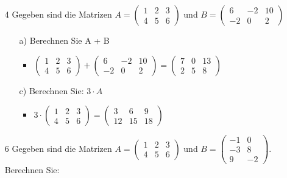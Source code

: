 \documentclass{article}
\begin{document}
\begin{itemize}
		\item[4]{Gegeben sind die Matrizen $A=\begin{pmatrix} 1 & 2 & 3 \\ 4 & 5 & 6 \end{pmatrix}$ und $B=\begin{pmatrix} 6 & -2 & 10 \\ -2 & 0 & 2 \end{pmatrix}$}
		\begin{itemize}
			\item[a)]{Berechnen Sie A + B}
			\begin{itemize}
				\item{$\begin{pmatrix} 1 & 2 & 3 \\ 4 & 5 & 6 \end{pmatrix}+\begin{pmatrix} 6 & -2 & 10 \\ -2 & 0 & 2 \end{pmatrix}=\begin{pmatrix} 7 & 0 & 13 \\ 2 & 5 & 8 \end{pmatrix}$}
			\end{itemize}
			\item[c)]{Berechnen Sie: $3 \cdot A$}
			\begin{itemize}
				\item{$3\cdot\begin{pmatrix} 1 & 2 & 3 \\ 4 & 5 & 6 \end{pmatrix}=\begin{pmatrix} 3 & 6 & 9 \\ 12 & 15 & 18 \end{pmatrix}$}
			\end{itemize}
		\end{itemize}
		\item[6]{Gegeben sind die Matrizen $A=\begin{pmatrix} 1 & 2 & 3 \\ 4 & 5 & 6 \end{pmatrix}$ und $B=\begin{pmatrix} -1 & 0 \\ -3 & 8 \\ 9 & -2 \end{pmatrix}$. Berechnen Sie:}
		\begin{itemize}

\end{itemize}
\end{itemize}
\end{document}
